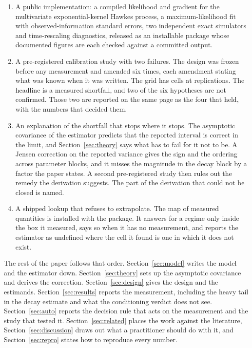 \begin{enumerate}
\item A public implementation: a compiled likelihood and gradient for the
multivariate exponential-kernel Hawkes process, a maximum-likelihood fit with
observed-information standard errors, two independent exact simulators and
time-rescaling diagnostics, released as an installable package whose documented
figures are each checked against a committed output.
\item A pre-registered calibration study with two failures. The design was frozen
before any measurement and amended six times, each amendment stating what was known
when it was written. The grid has \HsixCells{} cells at \HsixReplications{}
replications. The headline is a measured shortfall, and two of the six hypotheses
are not confirmed. Those two are reported on the same page as the four that held,
with the numbers that decided them.
\item An explanation of the shortfall that stops where it stops. The asymptotic
covariance of the estimator predicts that the reported interval is correct in the
limit, and Section~\ref{sec:theory} says what has to fail for it not to be. A Jensen
correction on the reported variance gives the sign and the ordering across parameter
blocks, and it misses the magnitude in the decay block by a factor the paper
states. A second pre-registered study then rules out the remedy the derivation
suggests. The part of the derivation that could not be closed is named.
\item A shipped lookup that refuses to extrapolate. The map of measured quantities
is installed with the package. It answers for a regime only inside the box it
measured, says so when it has no measurement, and reports the estimator as
undefined where the cell it found is one in which it does not exist.
\end{enumerate}

The rest of the paper follows that order. Section~\ref{sec:model} writes the model
and the estimator down. Section~\ref{sec:theory} sets up the asymptotic covariance
and derives the correction. Section~\ref{sec:design} gives the design and the
estimands. Section~\ref{sec:results} reports the measurement, including the heavy
tail in the decay estimate and what the conditioning verdict does not see.
Section~\ref{sec:auto} reports the decision rule that acts on the measurement and
the study that tested it. Section~\ref{sec:related} places the work against the
literature, Section~\ref{sec:discussion} draws out what a practitioner should do
with it, and Section~\ref{sec:repro} states how to reproduce every number.
